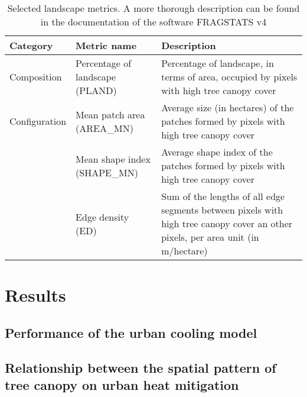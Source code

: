 \documentclass[12pt]{iopart}
\begin{document}
\begin{table}[!h]
  \footnotesize %
  \caption{\label{tab:selected-metrics}Selected landscape metrics. A more thorough description can be found in the documentation of the software FRAGSTATS v4 \cite{mcgarigal2012fragstats}}
  \renewcommand{\arraystretch}{1.5} %
  \begin{center}
  \begin{tabular}{p{} p{} p{}} 
    \toprule
    \textbf{Category} & \textbf{Metric name} & \textbf{Description} \\
    \midrule
    Composition & Percentage of landscape (PLAND) & Percentage of landscape, in terms of area, occupied by pixels with high tree canopy cover \\
    Configuration & Mean patch area (AREA\_MN) & Average size (in hectares) of the patches formed by pixels with high tree canopy cover \\
    & Mean shape index (SHAPE\_MN) & Average shape index of the patches formed by pixels with high tree canopy cover \\
    & Edge density (ED) & Sum of the lengths of all edge segments between pixels with high tree canopy cover an other pixels, per area unit (in m/hectare) \\    
    \bottomrule  
  \end{tabular}
  \end{center}
\end{table}


\section{Results}

\subsection{Performance of the urban cooling model}



\subsection{Relationship between the spatial pattern of tree canopy on urban heat mitigation}
\end{document}
